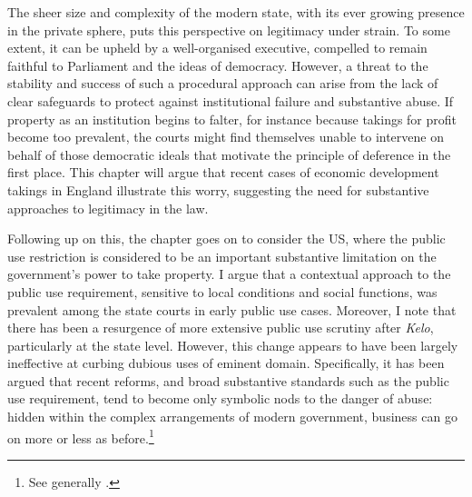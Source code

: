 The sheer size and complexity of the modern state, with its ever growing presence in the private sphere, puts this perspective on legitimacy under strain. To some extent, it can be upheld by a well-organised executive, compelled to remain faithful to Parliament and the ideas of democracy. However, a threat to the stability and success of such a procedural approach can arise from the lack of clear safeguards to protect against institutional failure and substantive abuse. If property as an institution begins to falter, for instance because takings for profit become too prevalent, the courts might find themselves unable to intervene on behalf of those democratic ideals that motivate the principle of deference in the first place. This chapter will argue that recent cases of economic development takings in England illustrate this worry, suggesting the need for substantive approaches to legitimacy in the law.

Following up on this, the chapter goes on to consider the US, where the public use restriction is considered to be an important substantive limitation on the government's power to take property. I argue that a contextual approach to the public use requirement, sensitive to local conditions and social functions, was prevalent among the state courts in early public use cases. Moreover, I note that there has been a resurgence of more extensive public use scrutiny after {\it Kelo}, particularly at the state level. However, this change appears to have been largely ineffective at curbing dubious uses of eminent domain. Specifically, it has been argued that recent reforms, and broad substantive standards such as the public use requirement, tend to become only symbolic nods to the danger of abuse: hidden within the complex arrangements of modern government, business can go on more or less as before.\footnote{See generally \cite{somin09}.}



